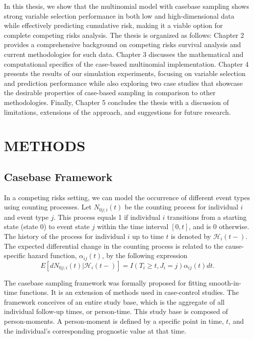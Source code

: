 \documentclass[AMA,Times1COL]{WileyNJDv5} %
\begin{document}
In this thesis, we show that the multinomial model with casebase sampling shows strong variable selection performance in both low and high-dimensional data while effectively predicting cumulative risk, making it a viable option for complete competing risks analysis. The thesis is organized as follows: Chapter 2 provides a comprehensive background on competing risks survival analysis and current methodologies for such data. Chapter 3 discusses the mathematical and computational specifics of the case-based multinomial implementation. Chapter 4 presents the results of our simulation experiments, focusing on variable selection and prediction performance while also exploring two case studies that showcase the desirable properties of case-based sampling in comparison to other methodologies. Finally, Chapter 5 concludes the thesis with a discussion of limitations, extensions of the approach, and suggestions for future research. 


\section{METHODS}\label{sec2}

\subsection{Casebase Framework}

In a competing risks setting, we can model the occurrence of different event types using counting processes. Let $N_{0j;i}(t)$ be the counting process for individual $i$ and event type $j$. This process equals 1 if individual $i$ transitions from a starting state (state 0) to event state $j$ within the time interval $[0, t]$, and is 0 otherwise. The history of the process for individual $i$ up to time $t$ is denoted by $\mathcal{H}_{i}(t-)$. The expected differential change in the counting process is related to the cause-specific hazard function, $\alpha_{ij}(t)$, by the following expression
$$E[dN_{0j;i}(t) | \mathcal{H}_{i}(t-)] = I(T_i \ge t, J_i = j) \alpha_{ij}(t)dt.$$

The casebase sampling framework was formally proposed for fitting smooth-in-time functions. It is an extension of methods used in case-control studies. The framework conceives of an entire study base, which is the aggregate of all individual follow-up times, or person-time. This study base is composed of person-moments. A person-moment is defined by a specific point in time, $t$, and the individual's corresponding prognostic value at that time.
\end{document}

